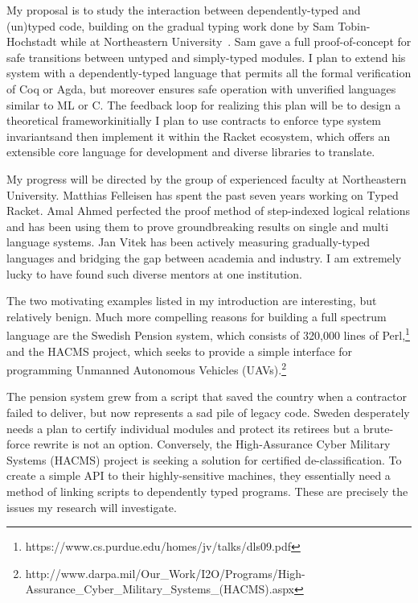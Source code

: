 \documentclass[12pt]{article}
\newcommand{\hdr}[2]{\vspace{-0.4cm}{\flushleft{\hrulefill\\\textbf{#1}\hfill{#2}\\\vspace{-0.2cm}\hrulefill}}\vspace{0.1cm}}
\begin{document}
My proposal is to study the interaction between dependently-typed and (un)typed code, building on the gradual typing work done by Sam Tobin-Hochstadt while at Northeastern University~\cite{tobin2010typed}.
Sam gave a full proof-of-concept for safe transitions between untyped and simply-typed modules.
I plan to extend his system with a dependently-typed language that permits all the formal verification of Coq or Agda, but moreover ensures safe operation with unverified languages similar to ML or C.
The feedback loop for realizing this plan will be to design a theoretical framework\textemdash initially I plan to use contracts to enforce type system invariants\textemdash and then implement it within the Racket ecosystem, which offers an extensible core language for development and diverse libraries to translate.

My progress will be directed by the group of experienced faculty at Northeastern University.
Matthias Felleisen has spent the past seven years working on Typed Racket.
Amal Ahmed perfected the proof method of step-indexed logical relations and has been using them to prove groundbreaking results on single and multi language systems.
Jan Vitek has been actively measuring gradually-typed languages and bridging the gap between academia and industry.
I am extremely lucky to have found such diverse mentors at one institution.

\newpage

\hdr{Broader Impacts}{}

The two motivating examples listed in my introduction are interesting, but relatively benign.
Much more compelling reasons for building a full spectrum language are the Swedish Pension system, which consists of 320,000 lines of Perl,\footnote{https://www.cs.purdue.edu/homes/jv/talks/dls09.pdf} and the HACMS project, which seeks to provide a simple interface for programming Unmanned Autonomous Vehicles (UAVs).\footnote{http://www.darpa.mil/Our\_Work/I2O/Programs/High-Assurance\_Cyber\_Military\_Systems\_(HACMS).aspx}

The pension system grew from a script that saved the country when a contractor failed to deliver, but now represents a sad pile of legacy code.
Sweden desperately needs a plan to certify individual modules and protect its retirees but a brute-force rewrite is not an option.
Conversely, the High-Assurance Cyber Military Systems (HACMS) project is seeking a solution for certified de-classification.
To create a simple API to their highly-sensitive machines, they essentially need a method of linking scripts to dependently typed programs.
These are precisely the issues my research will investigate.
\end{document}
